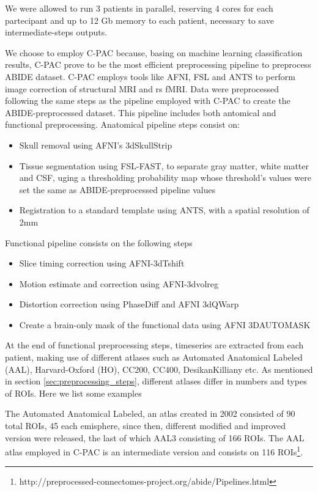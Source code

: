 \documentclass[11pt]{report}
\begin{document}
We were allowed to run 3 patients in parallel, reserving 4 cores for each partecipant and up to 12 Gb memory to each patient, necessary to save intermediate-steps outputs.

We choose to employ C-PAC because, basing on machine learning classification results, \cite{yang2020} C-PAC prove to be the most efficient preprocessing pipeline to preprocess ABIDE dataset.
C-PAC employs tools like AFNI, FSL and ANTS to perform image correction of structural MRI and rs fMRI.
Data were preprocessed following the same steps as the pipeline employed with C-PAC to create the ABIDE-preprocessed dataset.
This pipeline includes both antomical and functional preprocessing.
Anatomical pipeline steps consist on:
\begin{itemize}
\item Skull removal using AFNI's 3dSkullStrip
\item Tissue segmentation using FSL-FAST, to separate gray matter, white matter and CSF, uging a thresholding probability map whose threshold's values were set the same as ABIDE-preprocessed pipeline values
\item Registration to a standard template using ANTS, with a spatial resolution of 2mm
\end{itemize}
Functional pipeline consists on the following steps
\begin{itemize}
\item Slice timing correction using AFNI-3dTshift
\item Motion estimate and correction using AFNI-3dvolreg
\item Distortion correction using PhaseDiff and AFNI 3dQWarp
\item Create a brain-only mask of the functional data using AFNI 3DAUTOMASK
\end{itemize}

\hfill

At the end of functional preprocessing steps, timeseries are extracted from each patient, making use of different atlases such as Automated Anatomical Labeled (AAL), Harvard-Oxford (HO), CC200, CC400, DesikanKilliany etc.
As mentioned in section \ref{sec:preprocessing_steps}, different atlases differ in numbers and types of ROIs. Here we list some examples

The Automated Anatomical Labeled, an atlas created in 2002 \cite{mazoyer-2002} consisted of 90 total ROIs, 45 each emisphere, since then, different modified and improved version were released, the last of which AAL3 consisting of 166 ROIs. The AAL atlas employed in C-PAC is an intermediate version and consists on 116 ROIs\footnote{http://preprocessed-connectomes-project.org/abide/Pipelines.html}.
\end{document}
